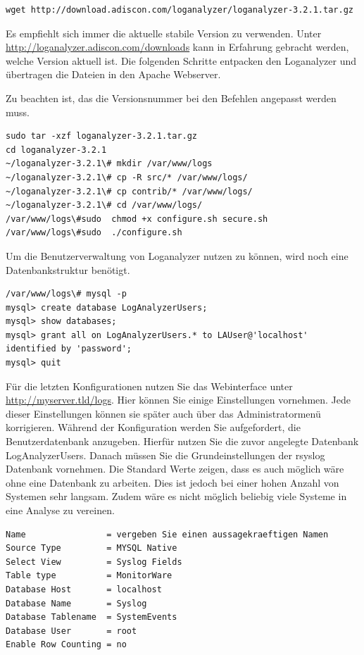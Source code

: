\begin{lstlisting}
wget http://download.adiscon.com/loganalyzer/loganalyzer-3.2.1.tar.gz
\end{lstlisting}

Es empfiehlt sich immer die aktuelle stabile Version zu verwenden. Unter \url{http://loganalyzer.adiscon.com/downloads} kann in Erfahrung gebracht werden, welche Version aktuell ist. 
Die folgenden Schritte entpacken den Loganalyzer und übertragen die Dateien in den Apache Webserver.

\begin{informationnote}
	Zu beachten ist, das die Versionsnummer bei den Befehlen angepasst werden muss.
\end{informationnote}

\begin{lstlisting}
sudo tar -xzf loganalyzer-3.2.1.tar.gz 
cd loganalyzer-3.2.1
~/loganalyzer-3.2.1\# mkdir /var/www/logs
~/loganalyzer-3.2.1\# cp -R src/* /var/www/logs/
~/loganalyzer-3.2.1\# cp contrib/* /var/www/logs/
~/loganalyzer-3.2.1\# cd /var/www/logs/
/var/www/logs\#sudo  chmod +x configure.sh secure.sh
/var/www/logs\#sudo  ./configure.sh
\end{lstlisting}

Um die Benutzerverwaltung von Loganalyzer nutzen zu können, wird noch eine Datenbankstruktur benötigt.

\begin{lstlisting}
/var/www/logs\# mysql -p
mysql> create database LogAnalyzerUsers;
mysql> show databases;
mysql> grant all on LogAnalyzerUsers.* to LAUser@'localhost' identified by 'password';
mysql> quit
\end{lstlisting}

Für die letzten Konfigurationen nutzen Sie das Webinterface unter \url{http://myserver.tld/logs}. Hier können Sie einige Einstellungen vornehmen. Jede dieser Einstellungen können sie später auch über das Administratormenü korrigieren. 
Während der Konfiguration werden Sie aufgefordert, die Benutzerdatenbank anzugeben. Hierfür nutzen Sie die zuvor angelegte Datenbank LogAnalyzerUsers.
Danach müssen Sie die Grundeinstellungen der rsyslog Datenbank vornehmen. Die Standard Werte zeigen, dass es auch möglich wäre ohne eine Datenbank zu arbeiten. Dies ist jedoch bei einer hohen Anzahl von Systemen sehr langsam. Zudem wäre es nicht möglich beliebig viele Systeme in eine Analyse zu vereinen.

\begin{lstlisting}
Name                = vergeben Sie einen aussagekraeftigen Namen
Source Type         = MYSQL Native
Select View         = Syslog Fields
Table type          = MonitorWare
Database Host       = localhost
Database Name       = Syslog
Database Tablename  = SystemEvents
Database User       = root
Enable Row Counting = no
\end{lstlisting}

